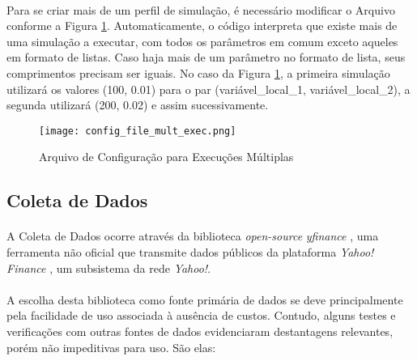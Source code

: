 \paragraph{} Para se criar mais de um perfil de simulação, é necessário modificar o Arquivo conforme a Figura \ref{fig:102}. Automaticamente, o código interpreta que existe mais de uma simulação a executar, com todos os parâmetros em comum exceto aqueles em formato de listas. Caso haja mais de um parâmetro no formato de lista, seus comprimentos precisam ser iguais. No caso da Figura \ref{fig:102}, a primeira simulação utilizará os valores (100, 0.01) para o par (variável\_local\_1, variável\_local\_2), a segunda utilizará (200, 0.02) e assim sucessivamente.

\begin{figure}[!htb]
    \texttt{[image: config\_file\_mult\_exec.png]}
    \centering
    \caption{Arquivo de Configuração para Execuções Múltiplas}
    \label{fig:102}
\end{figure}



\FloatBarrier
\subsection{Coleta de Dados}
\label{coleta_de_dados}

\paragraph{} A Coleta de Dados ocorre através da biblioteca \textit{open-source} \textit{yfinance} \cite{yfinance}, uma ferramenta não oficial que transmite dados públicos da plataforma \textit{Yahoo! Finance} \cite{yahoo_finance}, um subsistema da rede \textit{Yahoo!}.

\paragraph{} A escolha desta biblioteca como fonte primária de dados se deve principalmente pela facilidade de uso associada à ausência de custos. Contudo, alguns testes e verificações com outras fontes de dados evidenciaram destantagens relevantes, porém não impeditivas para uso. São elas:

